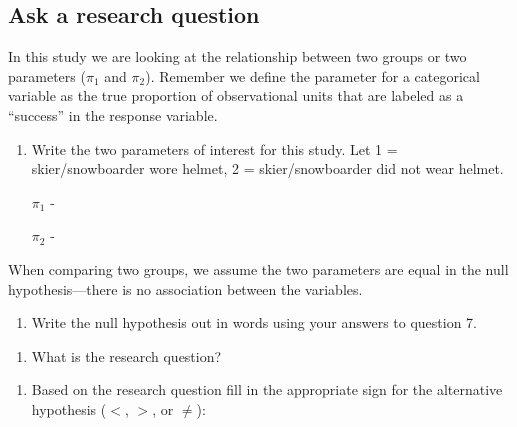 \documentclass[
]{report}
\providecommand{\tightlist}{%
  \setlength{\itemsep}{0pt}\setlength{\parskip}{0pt}}
\begin{document}
\vspace{.6in}

\hypertarget{ask-a-research-question}{%
\subsection*{Ask a research question}\label{ask-a-research-question}}

In this study we are looking at the relationship between two groups or two parameters (\(\pi_1\) and \(\pi_2\)). Remember we define the parameter for a categorical variable as the true proportion of observational units that are labeled as a ``success'' in the response variable.

\begin{enumerate}
\def\labelenumi{\arabic{enumi}.}
\setcounter{enumi}{6}
\item
  Write the two parameters of interest for this study. Let 1 = skier/snowboarder wore helmet, 2 = skier/snowboarder did not wear helmet.

  \(\pi_1\) -
  \vspace{0.5in}

  \(\pi_2\) -
  \vspace{0.5in}
\end{enumerate}

When comparing two groups, we assume the two parameters are equal in the null hypothesis---there is no association between the variables.

\begin{enumerate}
\def\labelenumi{\arabic{enumi}.}
\setcounter{enumi}{7}
\tightlist
\item
  Write the null hypothesis out in words using your answers to question 7.
\end{enumerate}

\vspace{1in}

\begin{enumerate}
\def\labelenumi{\arabic{enumi}.}
\setcounter{enumi}{8}
\tightlist
\item
  What is the research question?
\end{enumerate}

\vspace{1in}

\begin{enumerate}
\def\labelenumi{\arabic{enumi}.}
\setcounter{enumi}{9}
\tightlist
\item
  Based on the research question fill in the appropriate sign for the alternative hypothesis (\(<\), \(>\), or \(\neq\)):
  \vspace{0.25in}
\end{enumerate}
\end{document}
